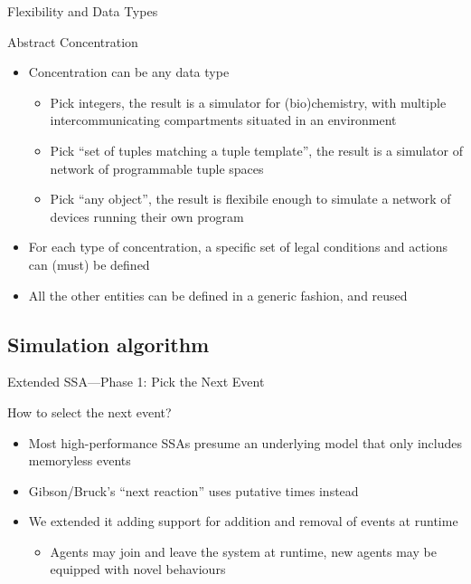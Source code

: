 \documentclass[presentation]{beamer} %
\begin{document}
\begin{frame}{Flexibility and Data Types}
  \begin{block}{Abstract Concentration}
    \begin{itemize}
    \item Concentration can be any data type
      \begin{itemize}
        \item Pick integers, the result is a simulator for (bio)chemistry, with multiple intercommunicating compartments situated in an environment \cite{drosophila}
        \item Pick ``set of tuples matching a tuple template'', the result is a simulator of network of programmable tuple spaces
        \item Pick ``any object'', the result is flexibile enough to simulate a network of devices running their own program \cite{protelis}
      \end{itemize}
    \item For each type of concentration, a specific set of legal conditions and actions can (must) be defined
    \item All the other entities can be defined in a generic fashion, and reused 
    \end{itemize}
  \end{block}
\end{frame}

\subsection{Simulation algorithm}

\begin{frame}{Extended SSA---Phase 1: Pick the Next Event}
  \begin{block}{How to select the next event?}
    \begin{itemize}
      \item Most high-performance SSAs presume an underlying model that only includes memoryless events \cite{slepoy2008}
      \item Gibson/Bruck's ``next reaction'' uses putative times instead
      \item We extended it adding support for addition and removal of events at runtime
      \begin{itemize}
        \item Agents may join and leave the system at runtime, new agents may be equipped with novel behaviours
      \end{itemize}
    \end{itemize}
  \end{block}
\end{frame}
\end{document}
